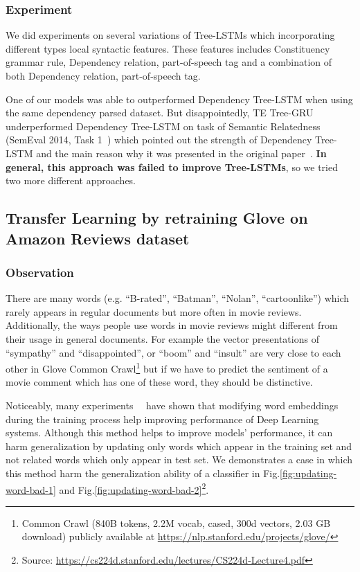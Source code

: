 \subsubsection{Experiment}
We did experiments on several variations of Tree-LSTMs which incorporating different types local syntactic features.
These features includes Constituency grammar rule, Dependency relation, part-of-speech tag and a combination of both Dependency relation, part-of-speech tag.

One of our models was able to outperformed Dependency Tree-LSTM when using the same dependency parsed dataset.
But disappointedly, TE Tree-GRU underperformed Dependency Tree-LSTM on task of Semantic Relatedness (SemEval 2014, Task 1~\cite{SemeEvalTask1}) which pointed out the strength of Dependency Tree-LSTM and the main reason why it was presented in the original paper~\cite{treeLSTM}.
\textbf{In general, this approach was failed to improve Tree-LSTMs}, so we tried two more different approaches.

\subsection{Transfer Learning by retraining Glove on Amazon Reviews dataset}
\subsubsection{Observation}
There are many words (e.g. ``B-rated'', ``Batman'', ``Nolan'', ``cartoonlike'') which rarely appears in regular documents but more often in movie reviews.
Additionally, the ways people use words in movie reviews might different from their usage in general documents.
For example the vector presentations of ``sympathy'' and ``disappointed'', or ``boom'' and ``insult'' are very close to each other in Glove Common Crawl\footnote{Common Crawl (840B tokens, 2.2M vocab, cased, 300d vectors, 2.03 GB download) publicly available at \url{https://nlp.stanford.edu/projects/glove/}} but if we have to predict the sentiment of a movie comment which has one of these word, they should be distinctive.

Noticeably, many experiments~\cite{treeLSTM}~\cite{KimCNN} have shown that modifying word embeddings during the training process help improving performance of Deep Learning systems.
Although this method helps to improve models' performance, it can harm generalization by updating only words which appear in the training set and not related words which only appear in test set.
We demonstrates a case in which this method harm the generalization ability of a classifier in Fig.\ref{fig:updating-word-bad-1} and Fig.\ref{fig:updating-word-bad-2}\footnote{Source: \url{https://cs224d.stanford.edu/lectures/CS224d-Lecture4.pdf}}.


